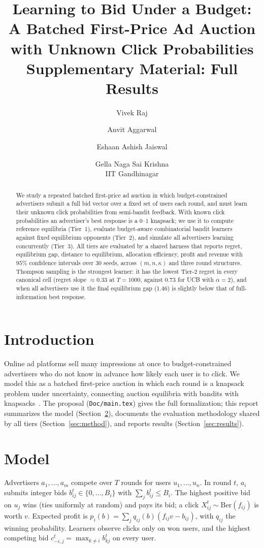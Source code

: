 \documentclass[11pt]{article}
\title{Learning to Bid Under a Budget: A Batched First-Price Ad Auction\\with Unknown Click Probabilities\\[0.4em]\large Supplementary Material: Full Results}
\author{Vivek Raj \and Anvit Aggarwal \and Eshaan Ashish Jaiswal \and Gella Naga Sai Krishna\\[0.3em]
\small IIT Gandhinagar}
\date{}
\theoremstyle{remark}
\begin{document}
\maketitle

\begin{abstract}
We study a repeated batched first-price ad auction in which budget-constrained advertisers submit a full
bid vector over a fixed set of users each round, and must learn their unknown click probabilities from
semi-bandit feedback. With known click probabilities an advertiser's best response is a $0$--$1$ knapsack;
we use it to compute reference equilibria (Tier~1), evaluate budget-aware combinatorial bandit learners
against fixed equilibrium opponents (Tier~2), and simulate all advertisers learning concurrently (Tier~3).
All tiers are evaluated by a shared harness that reports regret, equilibrium gap, distance to equilibrium,
allocation efficiency, profit and revenue with $95\%$ confidence intervals over $30$ seeds, across
$(m,n,\kappa)$ and three round structures.
Thompson sampling is the strongest learner: it has the lowest Tier-2 regret in every canonical cell
(regret slope $\approx0.33$ at $T=1000$, against $0.73$ for UCB with $\alpha=2$), and when all advertisers
use it the final equilibrium gap ($1.46$) is slightly below that of full-information best response.
\end{abstract}

\section{Introduction}
Online ad platforms sell many impressions at once to budget-constrained advertisers who do not know in
advance how likely each user is to click. We model this as a batched first-price auction in which each
round is a knapsack problem under uncertainty, connecting auction equilibria with bandits with
knapsacks~\cite{badanidiyuru2013bandits}. The proposal (\texttt{Doc/main.tex}) gives the full
formalization; this report summarizes the model (Section~\ref{sec:model}), documents the evaluation
methodology shared by all tiers (Section~\ref{sec:method}), and reports results
(Section~\ref{sec:results}).

\section{Model}\label{sec:model}
Advertisers $a_1,\dots,a_m$ compete over $T$ rounds for users $u_1,\dots,u_n$. In round $t$, $a_i$
submits integer bids $b^t_{ij}\in\{0,\dots,B_i\}$ with $\sum_j b^t_{ij}\le B_i$. The highest positive
bid on $u_j$ wins (ties uniformly at random) and pays its bid; a click
$X_{ij}^t\sim\mathrm{Ber}(f_{ij})$ is worth $v$. Expected profit is
$p_i(b)=\sum_j q_{ij}(b)(f_{ij}v-b_{ij})$, with $q_{ij}$ the winning probability. Learners observe clicks
only on won users, and the highest competing bid $c^t_{-i,j}=\max_{k\ne i}b^t_{kj}$ on every user.
\end{document}
